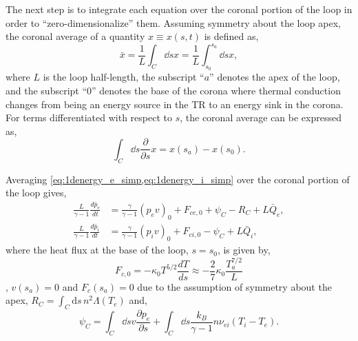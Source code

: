 The next step is to integrate each equation over the coronal portion of the loop in order to ``zero-dimensionalize'' them. Assuming symmetry about the loop apex, the coronal average of a quantity $x\equiv x(s,t)$ is defined as,
\begin{equation*}
    \bar{x} = \frac{1}{L}\int_C\dd{s}x = \frac{1}{L}\int_{s_0}^{s_a}\dd{s}x,
\end{equation*}
where $L$ is the loop half-length, the subscript ``$a$'' denotes the apex of the loop, and the subscript ``$0$'' denotes the base of the corona where thermal conduction changes from being an energy source in the TR to an energy sink in the corona. For terms differentiated with respect to $s$, the coronal average can be expressed as,
\begin{equation*}
    \int_C\dd{s}\frac{\partial}{\partial s}x = x(s_a) - x(s_0).
\end{equation*}

Averaging \cref{eq:1denergy_e_simp,eq:1denergy_i_simp} over the coronal portion of the loop gives,
\begin{align}
    \frac{L}{\gamma - 1}\frac{d \bar{p}_e}{dt} &= \frac{\gamma}{\gamma - 1}(p_ev)_0 + F_{ce,0} + \psi_C - R_C + L\bar{Q}_{e},\label{eq:1denergy_e_C} \\
    \frac{L}{\gamma - 1}\frac{d \bar{p}_i}{dt} &= \frac{\gamma}{\gamma - 1}(p_iv)_0 + F_{ci,0} - \psi_C + L\bar{Q}_{i},\label{eq:1denergy_i_C}
\end{align}
where the heat flux at the base of the loop, $s=s_0$, is given by,
\begin{equation}\label{eq:heat-flux-ebtel}
    F_{c,0} = -\kappa_0T^{5/2}\frac{dT}{ds} \approx -\frac{2}{7}\kappa_0\frac{T_a^{7/2}}{L}
\end{equation}
\citep{klimchuk_highly_2008}, $v(s_a)=0$ and $F_c(s_a)=0$ due to the assumption of symmetry about the apex, $R_C=\int_C\mathrm{d}s\,n^2\Lambda(T_e)$ and,
\begin{equation}\label{eq:psi_c_full}
    \psi_C=\int_C\dd{s}v\frac{\partial p_e}{\partial s} + \int_C\dd{s}\frac{k_B}{\gamma - 1}n\nu_{ei}(T_i - T_e).
\end{equation}

